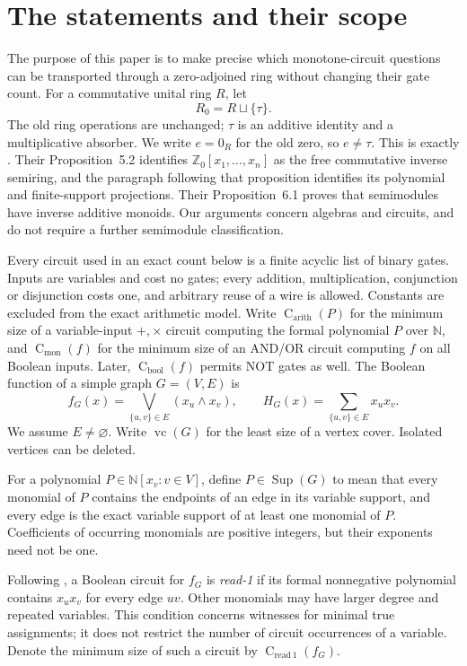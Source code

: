 \documentclass[11pt]{article}
\newcommand{\N}{\mathbb N}
\newcommand{\Z}{\mathbb Z}
\newcommand{\Sup}{\operatorname{Sup}}
\newcommand{\vc}{\operatorname{vc}}
\newcommand{\cmon}{\operatorname{C}_{\mathrm{mon}}}
\newcommand{\cbool}{\operatorname{C}_{\mathrm{bool}}}
\newcommand{\car}{\operatorname{C}_{\mathrm{arith}}}
\newcommand{\cread}{\operatorname{C}_{\mathrm{read}\,1}}
\theoremstyle{definition}
\theoremstyle{remark}
\begin{document}
\section{The statements and their scope}
The purpose of this paper is to make precise which monotone-circuit questions can be transported through a zero-adjoined ring without changing their gate count.
For a commutative unital ring $R$, let
\[
 R_0=R\sqcup\{\tau\}.
\]
The old ring operations are unchanged; $\tau$ is an additive identity and a multiplicative absorber. We write $e=0_R$ for the old zero, so $e\ne\tau$. This is exactly \citet[Definition~3.6]{FGJM}. Their Proposition~5.2 identifies $\Z_0[x_1,\ldots,x_n]$ as the free commutative inverse semiring, and the paragraph following that proposition identifies its polynomial and finite-support projections. Their Proposition~6.1 proves that semimodules have inverse additive monoids. Our arguments concern algebras and circuits, and do not require a further semimodule classification.

Every circuit used in an exact count below is a finite acyclic list of binary gates. Inputs are variables and cost no gates; every addition, multiplication, conjunction or disjunction costs one, and arbitrary reuse of a wire is allowed. Constants are excluded from the exact arithmetic model. Write $\car(P)$ for the minimum size of a variable-input $+,\times$ circuit computing the formal polynomial $P$ over $\N$, and $\cmon(f)$ for the minimum size of an AND/OR circuit computing $f$ on all Boolean inputs. Later, $\cbool(f)$ permits NOT gates as well. The Boolean function of a simple graph $G=(V,E)$ is
\[
 f_G(x)=\bigvee_{\{u,v\}\in E}(x_u\wedge x_v),
 \qquad H_G(x)=\sum_{\{u,v\}\in E}x_ux_v.
\]
We assume $E\ne\varnothing$. Write $\vc(G)$ for the least size of a vertex cover. Isolated vertices can be deleted.

For a polynomial $P\in\N[x_v:v\in V]$, define $P\in\Sup(G)$ to mean that every monomial of $P$ contains the endpoints of an edge in its variable support, and every edge is the exact variable support of at least one monomial of $P$. Coefficients of occurring monomials are positive integers, but their exponents need not be one.

Following \citet[Definition~1, p.~6 of the author manuscript]{JuknaRead}, a Boolean circuit for $f_G$ is \emph{read-1} if its formal nonnegative polynomial contains $x_ux_v$ for every edge $uv$. Other monomials may have larger degree and repeated variables. This condition concerns witnesses for minimal true assignments; it does not restrict the number of circuit occurrences of a variable. Denote the minimum size of such a circuit by $\cread(f_G)$.
\end{document}

